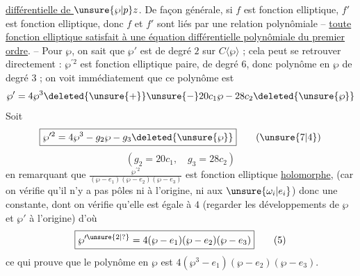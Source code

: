 \uline{ différentielle de $\unsure{\wp|p}z$}. De façon générale, si $f$ est fonction elliptique, $f'$ est fonction elliptique, donc $f$ et $f'$ sont liés par une relation polynômiale -- \uline{toute fonction elliptique satisfait à une équation différentielle polynômiale du premier ordre}. -- Pour $\wp$, on sait que $\wp'$ est de degré $2$ sur $C\langle\wp\rangle$ ; cela peut se retrouver directement : $\wp^{\prime 2}$ est fonction elliptique paire, de degré $6$, donc polynôme en $\wp$ de degré $3$ ; on voit immédiatement   que ce polynôme est 
\[
\wp'=4\wp^3\deleted{\unsure{+}}\unsure{-}20c_1\wp-28c_2\deleted{\unsure{\wp}}
\]
Soit
\[
\boxed{\wp^{\prime 2}=4\wp^3-g_2\wp-g_3\deleted{\unsure{\wp}}}\tag*{(\unsure{7|4})}
\]
\[
(g_2=20c_1,\quad g_3=28c_2)
\]
 en remarquant que $\frac{\wp^{\prime 2}}{(\wp-e_1)(\wp-e_2)(\wp-e_3)}$ est fonction elliptique \uline{holomorphe}, (car on vérifie qu'il n'y a pas  pôles ni à l'origine, ni aux $\unsure{\omega_i|e_i}$) donc une constante, dont on vérifie qu'elle est égale à $4$ (regarder les développements de $\wp$ et $\wp'$ à l'origine) d'où
\[
\boxed{\wp^{\prime \unsure{2|?}}=4(\wp-e_1)(\wp-e_2)(\wp-e_3)}\tag*{(5)}
\]
ce qui prouve que le polynôme en $\wp$  est $4(\wp^3-e_1)(\wp-e_2)(\wp-e_3)$. 

